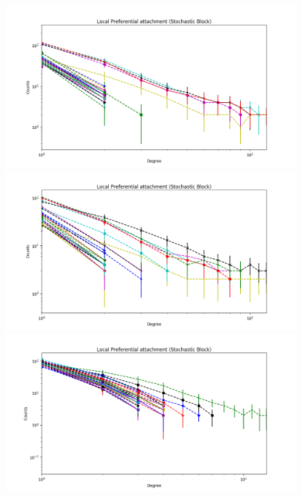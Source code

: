 \documentclass[a4paper, 12pt]{article}
\begin{document}
\begin{figure}[ht]
	\endminipage
		\vspace{-0.29cm}
	\includegraphics[scale=0.27]{img/expe/1_mmsb/figure_2}
	\endminipage
	\includegraphics[scale=0.27]{img/expe/2_mmsb/figure_2} 
	\endminipage
	\includegraphics[scale=0.27]{img/expe/3_mmsb/figure_2}
	\endminipage
		\vspace{-0.28cm}

\end{figure}
\end{document}
